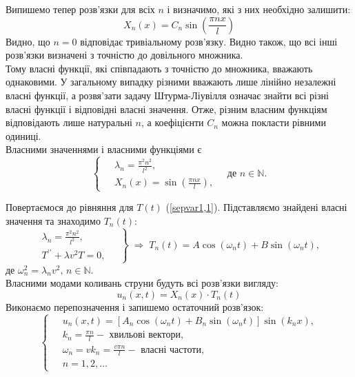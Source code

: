 Випишемо тепер розв'язки для всіх $n$ і визначимо, які з них необхідно залишити:
    \begin{equation*}
        X_n(x) = C_n \sin\left(\frac{\pi n x}{l}\right)
    \end{equation*}
    Видно, що $n = 0$ відповідає тривіальному розв'язку. Видно також, що всі інші розв'язки визначені з точністю до довільного множника.\\
    Тому власні функції, які співпадають з точністю до множника, вважають однаковими. У загальному випадку різними вважають лише лінійно незалежні власні функції, а розвя'зати задачу Штурма-Ліувілля означає знайти всі різні власні функції і відповідні власні значення. Отже, різним власним функціям відповідають лише натуральні $n$, а коефіцієнти $C_n$ можна покласти рівними одиниці.\\
    Власними значеннями і власними функціями є
    \begin{equation} \label{ShLsol1,1}
        \left\{ \begin{aligned}
            \;&\lambda_n = \frac{\pi^2 n^2}{l^2},\\ 
            &X_n(x) = \sin\left(\frac{\pi n x}{l}\right),
        \end{aligned} \right.
        \quad \text{де } n \in \mathbb{N}.
    \end{equation}

Повертаємося до рівняння для $T(t)$ (\ref{sepvar1,1}). Підставляємо знайдені власні значення та знаходимо $T_n(t)$:
\begin{equation*}
    \left. \begin{aligned}
        \lambda_n = \frac{\pi^2 n^2}{l^2},&\;\\ 
        T^{\prime\prime} + \lambda v^2T = 0,&
    \end{aligned} \right\}
    \;\Rightarrow\;
    T_n(t) = A\cos(\omega_n t) + B\sin(\omega_n t),
\end{equation*}
де $\omega_n^2 = \lambda_n v^2, \, n \in \mathbb{N}.$\\
Власними модами коливань струни будуть всі розв'язки вигляду:
\begin{equation*}
    u_n(x,t) = X_n(x) \cdot T_n(t)
\end{equation*}
Виконаємо перепозначення і запишемо остаточний розв'язок:
\begin{equation}
    \left\{ \begin{aligned} \label{mode1,1}
        \;&u_n(x,t) = \left[A_n\cos(\omega_n t) + B_n\sin(\omega_n t)\right] \sin(k_n x), \\
        &k_n = \frac{\pi n}{l} - \text{ хвильові вектори}, \\
        &\omega_n = vk_n = \frac{v \pi n}{l} - \text{ власні частоти}, \\
        &n = 1, 2,\ldots
    \end{aligned}\right.
\end{equation}

